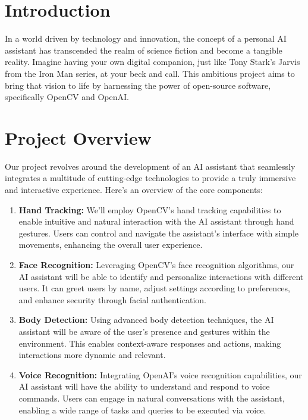 \documentclass{article}
\begin{document}
\section*{Introduction}
In a world driven by technology and innovation, the concept of a personal AI assistant has transcended the realm of science fiction and become a tangible reality. Imagine having your own digital companion, just like Tony Stark's Jarvis from the Iron Man series, at your beck and call. This ambitious project aims to bring that vision to life by harnessing the power of open-source software, specifically OpenCV and OpenAI.

\section*{Project Overview}
Our project revolves around the development of an AI assistant that seamlessly integrates a multitude of cutting-edge technologies to provide a truly immersive and interactive experience. Here's an overview of the core components:

\begin{enumerate}[label=\arabic*.]
  \item \textbf{Hand Tracking:} We'll employ OpenCV's hand tracking capabilities to enable intuitive and natural interaction with the AI assistant through hand gestures. Users can control and navigate the assistant's interface with simple movements, enhancing the overall user experience.

  \item \textbf{Face Recognition:} Leveraging OpenCV's face recognition algorithms, our AI assistant will be able to identify and personalize interactions with different users. It can greet users by name, adjust settings according to preferences, and enhance security through facial authentication.

  \item \textbf{Body Detection:} Using advanced body detection techniques, the AI assistant will be aware of the user's presence and gestures within the environment. This enables context-aware responses and actions, making interactions more dynamic and relevant.

  \item \textbf{Voice Recognition:} Integrating OpenAI's voice recognition capabilities, our AI assistant will have the ability to understand and respond to voice commands. Users can engage in natural conversations with the assistant, enabling a wide range of tasks and queries to be executed via voice.
\end{enumerate}
\end{document}
